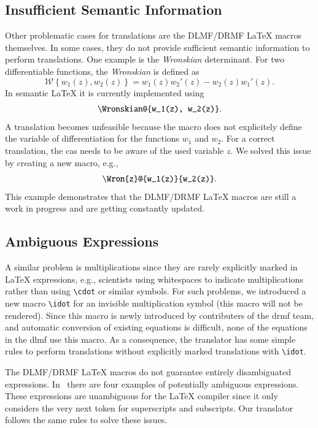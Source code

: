 \documentclass[a4paper,11pt]{article}
\newcommand{\DLMF}{DLMF}
\newcommand{\DRMF}{DRMF}
\newcommand{\Macro}{\DLMF/\DRMF{} \LaTeX{} macro}
\theoremstyle{defTheoStyle}
\theoremstyle{defExampStyle}
\begin{document}
\subsection{Insufficient Semantic Information}
Other problematic cases for translations are the \Macro s themselves. In some cases, they do not provide sufficient semantic information to perform translations. One example is the \textit{Wronskian} determinant. For two differentiable functions, the \textit{Wronskian} is defined as~\parencite[(1.13.4)]{NIST:DLMF}
\begin{equation*}
	\mathscr{W} \left\{ w_1(z), w_2(z) \right\} = w_1(z)w_2'(z) - w_2(z)w_1'(z).
\end{equation*}
In semantic \LaTeX{} it is currently implemented using
\begin{equation}
	\verb|\Wronskian@{w_1(z), w_2(z)}|.
\end{equation}
A translation becomes unfeasible because the macro does not explicitely define the variable of differentiation for the functions $w_1$ and $w_2$. For a correct translation, the \gls*{cas} needs to be aware of the used variable $z$. We solved this issue by creating a new macro, e.g.,
\begin{equation}
	\verb|\Wron{z}@{w_1(z)}{w_2(z)}|.
\end{equation}
This example demonstrates that the \Macro s are still a work in progress and are getting constantly updated.

\subsection{Ambiguous Expressions}
A similar problem is multiplications since they are rarely explicitly marked in \LaTeX{} expressions, e.g., scientists using whitespaces to indicate multiplications rather than using \verb|\cdot| or similar symbols. For such problems, we introduced a new macro \verb|\idot| for an invisible multiplication symbol (this macro will not be rendered). Since this macro is newly introduced by contributers of the \gls*{drmf} team, and automatic conversion of existing equations is difficult, none of the equations in the \gls*{dlmf} use this macro. As a consequence, the translator has some simple rules to perform translations without explicitly marked translations with \verb|\idot|.

The \Macro s do not guarantee entirely disambiguated expressions. In~ there are four examples of potentially ambiguous expressions. These expressions are unambiguous for the \LaTeX{} compiler since it only considers the very next token for superscripts and subscripts. Our translator follows the same rules to solve these issues.
\end{document}
